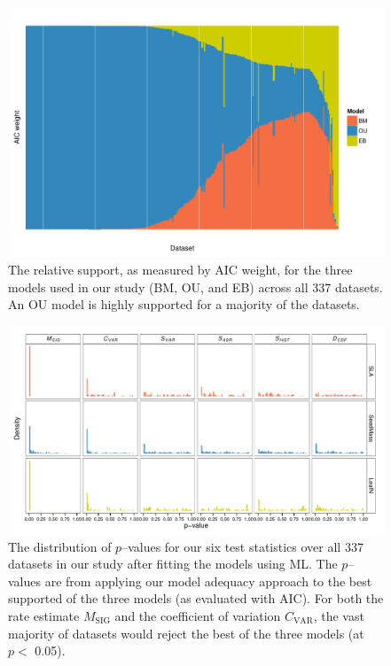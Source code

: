 \documentclass[a4paper,11pt]{article}
\begin{document}
\begin{figure}[p]
  \centering
  \includegraphics[angle=90, origin=c, scale=0.8]{figs/aic-support}
  \caption{The relative support, as measured by AIC weight, for the three models used in our study (BM, OU, and EB) across all 337 datasets. An OU model is highly supported for a majority of the datasets.}
  \label{fig:aic-support}
\end{figure}

\begin{figure}[p]
  \centering
  \includegraphics[angle=90, origin=c, scale=0.85]{figs/pval-hist-ml}
  \caption{The distribution of $p$--values for our six test statistics over all 337 datasets in our study after fitting the models using ML. The $p$--values are from applying our model adequacy approach to the best supported of the three models (as evaluated with AIC). For both the rate estimate $M_{\text{SIG}}$ and the coefficient of variation $C_{\text{VAR}}$, the vast majority of datasets would reject the best of the three models (at $p<$ 0.05).}
  \label{fig:pvalues}
\end{figure}
\end{document}
